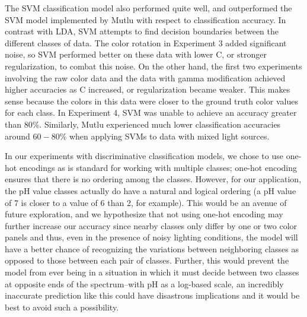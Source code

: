 \documentclass[journal]{IEEEtran}
\begin{document}
The SVM classification model also performed quite well, and outperformed the SVM model implemented by Mutlu with respect to classification accuracy. In contrast with LDA, SVM attempts to find decision boundaries between the different classes of data. The color rotation in Experiment 3 added significant noise, so SVM performed better on these data with lower C, or stronger regularization, to combat this noise. On the other hand, the first two experiments involving the raw color data and the data with gamma modification achieved higher accuracies as C increased, or regularization became weaker. This makes sense because the colors in this data were closer to the ground truth color values for each class. In Experiment 4, SVM was unable to achieve an accuracy greater than $80\%$. Similarly, Mutlu experienced much lower classification accuracies around $60-80\%$ when applying SVMs to data with mixed light sources.

In our experiments with discriminative classification models, we chose to use one-hot encodings as is standard for working with multiple classes; one-hot encoding ensures that there is no ordering among the classes. However, for our application, the pH value classes actually do have a natural and logical ordering (a pH value of 7 is closer to a value of 6 than 2, for example). This would be an avenue of future exploration, and we hypothesize that not using one-hot encoding may further increase our accuracy since nearby classes only differ by one or two color panels and thus, even in the presence of noisy lighting conditions, the model will have a better chance of recognizing the variations between neighboring classes as opposed to those between each pair of classes. Further, this would prevent the model from ever being in a situation in which it must decide between two classes at opposite ends of the spectrum--with pH as a log-based scale, an incredibly inaccurate prediction like this could have disastrous implications and it would be best to avoid such a possibility.
\end{document}

